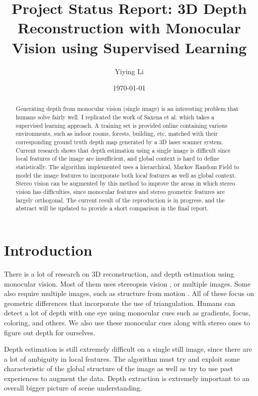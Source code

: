 \documentclass[journal]{IEEEtran}
\title{Project Status Report: 3D Depth Reconstruction with Monocular Vision using Supervised Learning}
\author{Yiying Li}
\date{\today}
\begin{document}
\maketitle

\begin{abstract}
Generating depth from monocular vision (single image) is an interesting problem that humans solve fairly well. I replicated the work of Saxena et al. \cite{saxena2008} which takes a supervised learning approach. A training set is provided online containing various environments, such as indoor rooms, forests, building, etc, matched with their corresponding ground truth depth map generated by a 3D laser scanner system. Current research shows that depth estimation using a single image is difficult since local features of the image are insufficient, and global context is hard to define statistically. The algorithm implemented uses a hierarchical, Markov Random Field to model the image features to incorporate both local features as well as global context. Stereo vision can be augmented by this method to improve the areas in which stereo vision has difficulties, since monocular features and stereo geometric features are largely orthogonal. The current result of the reproduction is in progress, and the abstract will be updated to provide a short comparison in the final report.
\end{abstract}

\section{Introduction}
There is a lot of research on 3D reconstruction, and depth estimation using monocular vision. Most of them uses stereopsis vision \cite{scharstein2003}, or multiple images. Some also require multiple images, such as structure from motion \cite{Forsyth:2002:CVM:580035}. All of these focus on geometric differences that incorporate the use of triangulation. Humans can detect a lot of depth with one eye using monocular cues such as gradients, focus, coloring, and others. We also use these monocular cues along with stereo ones to figure out depth for ourselves. 

Depth estimation is still extremely difficult on a single still image, since there are a lot of ambiguity in local features. The algorithm must try and exploit some characteristic of the global structure of the image as well as try to use past experiences to augment the data. Depth extraction is extremely important to an overall bigger picture of scene understanding. 
\end{document}
